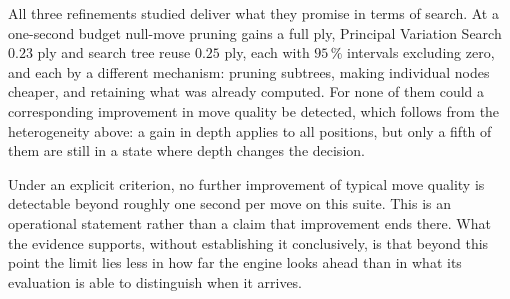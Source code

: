 All three refinements studied deliver what they promise in terms of search. At a
one-second budget null-move pruning gains a full ply, Principal Variation Search
$0.23$ ply and search tree reuse $0.25$ ply, each with $95\,\%$ intervals
excluding zero, and each by a different mechanism: pruning subtrees, making
individual nodes cheaper, and retaining what was already computed. For none of
them could a corresponding improvement in move quality be detected, which follows
from the heterogeneity above: a gain in depth applies to all positions, but only a
fifth of them are still in a state where depth changes the decision.

Under an explicit criterion, no further improvement of typical move quality is
detectable beyond roughly one second per move on this suite. This is an
operational statement rather than a claim that improvement ends there. What the
evidence supports, without establishing it conclusively, is that beyond this
point the limit lies less in how far the engine looks ahead than in what its
evaluation is able to distinguish when it arrives.
